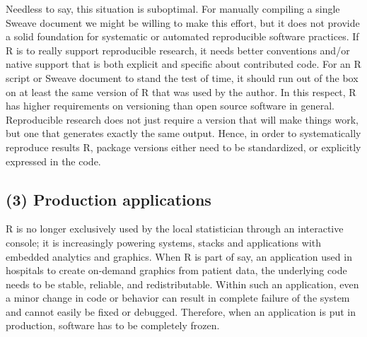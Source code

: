 Needless to say, this situation is suboptimal. For manually compiling a single
Sweave document we might be willing to make this effort, but it does not
provide a solid foundation for systematic or automated reproducible software
practices. If R is to really support reproducible research, it needs better
conventions and/or native support that is both explicit and specific about
contributed code. For an R script or Sweave document to stand the test of time,
it should run out of the box on at least the same version of R that was used by
the author. In this respect, R has higher requirements on versioning
than open source software in general. Reproducible research does not just
require a version that will make things work, but one that generates exactly the
same output. Hence, in order to systematically reproduce results R, package
versions either need to be standardized, or explicitly expressed in the code.

\subsection{(3) Production applications}

R is no longer exclusively used by the local statistician through an
interactive console; it is increasingly powering systems, stacks and
applications with embedded analytics and graphics. When R is part of say, an
application used in hospitals to create on-demand graphics from patient data,
the underlying code needs to be stable, reliable, and redistributable. Within
such an application, even a minor change in code or behavior can result in
complete failure of the system and cannot easily be fixed or debugged.
Therefore, when an application is put in production, software has to be
completely frozen.


